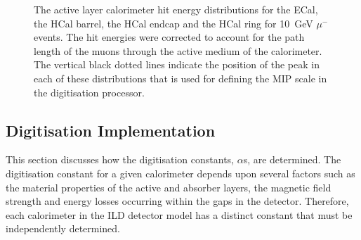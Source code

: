 \begin{figure}[h!]
\caption[The active layer calorimeter hit energy distributions for \protect{} the ECal, \protect{} the HCal barrel, \protect{} the HCal endcap and \protect{} the HCal ring for 10~GeV $\mu^{-}$ events.  The hit energies were corrected to account for the path length of the muons through the active medium of the calorimeter.  The vertical black dotted lines indicate the position of the peak in each of these distributions that is used for defining the MIP scale in the digitisation processor.]{The active layer calorimeter hit energy distributions for \protect{} the ECal, \protect{} the HCal barrel, \protect{} the HCal endcap and \protect{} the HCal ring for 10~GeV $\mu^{-}$ events.  The hit energies were corrected to account for the path length of the muons through the active medium of the calorimeter.  The vertical black dotted lines indicate the position of the peak in each of these distributions that is used for defining the MIP scale in the digitisation processor.}
\label{fig:digitisermip}
\end{figure}


\subsection{Digitisation Implementation}
\label{sec:digi}
This section discusses how the digitisation constants, $\alpha$s, are determined.  The digitisation constant for a given calorimeter depends upon several factors such as the material properties of the active and absorber layers, the magnetic field strength and energy losses occurring within the gaps in the detector.  Therefore, each calorimeter in the ILD detector model has a distinct constant that must be independently determined. 


